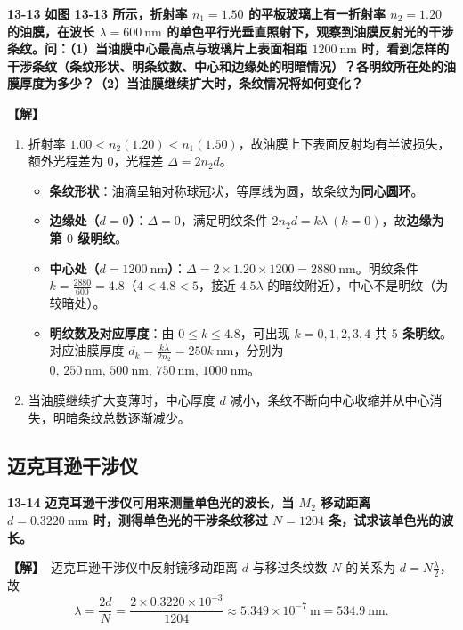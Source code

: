 \documentclass[zihao=5,a4paper,UTF8]{ctexart}
\newenvironment{prob}[2]{%
    \par\vspace{6pt}\noindent\textbf{\color{navy}#1} \textbf{#2}\par\nopagebreak\vspace{2pt}%
}{%
    \par\vspace{4pt}%
}
\newcommand{\sol}{\noindent\textbf{\color{tealaccent}【解】}\ }
\begin{document}
\begin{prob}{13-13}{如图 13-13 所示，折射率 $n_1=1.50$ 的平板玻璃上有一折射率 $n_2=1.20$ 的油膜，在波长 $\lambda=600\ \mathrm{nm}$ 的单色平行光垂直照射下，观察到油膜反射光的干涉条纹。问：（1）当油膜中心最高点与玻璃片上表面相距 $1200\ \mathrm{nm}$ 时，看到怎样的干涉条纹（条纹形状、明条纹数、中心和边缘处的明暗情况）？各明纹所在处的油膜厚度为多少？（2）当油膜继续扩大时，条纹情况将如何变化？}
\sol
\begin{enumerate}[leftmargin=2em, itemsep=2pt]
    \item 折射率 $1.00 < n_2(1.20) < n_1(1.50)$，故油膜上下表面反射均有半波损失，额外光程差为 $0$，光程差 $\Delta = 2n_2 d$。
    \begin{itemize}[leftmargin=1.5em]
        \item \textbf{条纹形状}：油滴呈轴对称球冠状，等厚线为圆，故条纹为\textbf{同心圆环}。
        \item \textbf{边缘处（$d=0$）}：$\Delta = 0$，满足明纹条件 $2n_2 d = k\lambda\ (k=0)$，故\textbf{边缘为第 $0$ 级明纹}。
        \item \textbf{中心处（$d=1200\ \mathrm{nm}$）}：$\Delta = 2\times 1.20\times 1200 = 2880\ \mathrm{nm}$。明纹条件 $k = \frac{2880}{600} = 4.8$（$4 < 4.8 < 5$，接近 $4.5\lambda$ 的暗纹附近），中心不是明纹（为较暗处）。
        \item \textbf{明纹数及对应厚度}：由 $0 \le k \le 4.8$，可出现 $k = 0, 1, 2, 3, 4$ 共 \textbf{$5$ 条明纹}。对应油膜厚度 $d_k = \frac{k\lambda}{2n_2} = 250k\ \mathrm{nm}$，分别为 $0,\, 250\ \mathrm{nm},\, 500\ \mathrm{nm},\, 750\ \mathrm{nm},\, 1000\ \mathrm{nm}$。
    \end{itemize}
    \item 当油膜继续扩大变薄时，中心厚度 $d$ 减小，条纹不断向中心收缩并从中心消失，明暗条纹总数逐渐减少。
\end{enumerate}
\end{prob}

\subsection{迈克耳逊干涉仪}

\begin{prob}{13-14}{迈克耳逊干涉仪可用来测量单色光的波长，当 $M_2$ 移动距离 $d=0.3220\ \mathrm{mm}$ 时，测得单色光的干涉条纹移过 $N=1204$ 条，试求该单色光的波长。}
\sol 迈克耳逊干涉仪中反射镜移动距离 $d$ 与移过条纹数 $N$ 的关系为 $d = N\frac{\lambda}{2}$，故
\[
    \lambda = \frac{2d}{N} = \frac{2\times 0.3220\times 10^{-3}}{1204} \approx 5.349\times 10^{-7}\ \mathrm{m} = 534.9\ \mathrm{nm}.
\]
\end{prob}
\end{document}
